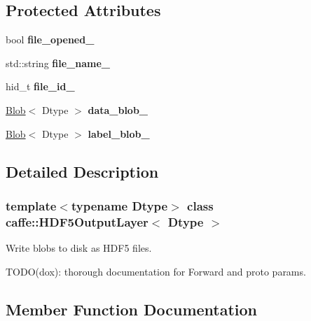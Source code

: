 \subsection*{Protected Attributes}
\begin{DoxyCompactItemize}
\item 
\mbox{\label{classcaffe_1_1_h_d_f5_output_layer_a995b7eadf9ccd19c02a7f54ee3dd97c2}} 
bool {\bfseries file\+\_\+opened\+\_\+}
\item 
\mbox{\label{classcaffe_1_1_h_d_f5_output_layer_aa4609affd7a57ba7481b98afed3f7985}} 
std\+::string {\bfseries file\+\_\+name\+\_\+}
\item 
\mbox{\label{classcaffe_1_1_h_d_f5_output_layer_a353a5e36b3baa08e381dc5da1bb8b74e}} 
hid\+\_\+t {\bfseries file\+\_\+id\+\_\+}
\item 
\mbox{\label{classcaffe_1_1_h_d_f5_output_layer_ab2156fd8c582113d46f35d7be040cd2c}} 
\mbox{\hyperlink{classcaffe_1_1_blob}{Blob}}$<$ Dtype $>$ {\bfseries data\+\_\+blob\+\_\+}
\item 
\mbox{\label{classcaffe_1_1_h_d_f5_output_layer_af89a2d288a5018e55a250c218552c867}} 
\mbox{\hyperlink{classcaffe_1_1_blob}{Blob}}$<$ Dtype $>$ {\bfseries label\+\_\+blob\+\_\+}
\end{DoxyCompactItemize}


\subsection{Detailed Description}
\subsubsection*{template$<$typename Dtype$>$\newline
class caffe\+::\+H\+D\+F5\+Output\+Layer$<$ Dtype $>$}

Write blobs to disk as H\+D\+F5 files. 

T\+O\+D\+O(dox)\+: thorough documentation for Forward and proto params. 

\subsection{Member Function Documentation}
\mbox{\label{classcaffe_1_1_h_d_f5_output_layer_a92fb5561414d7e8b8845b0279b1ee847}} 
